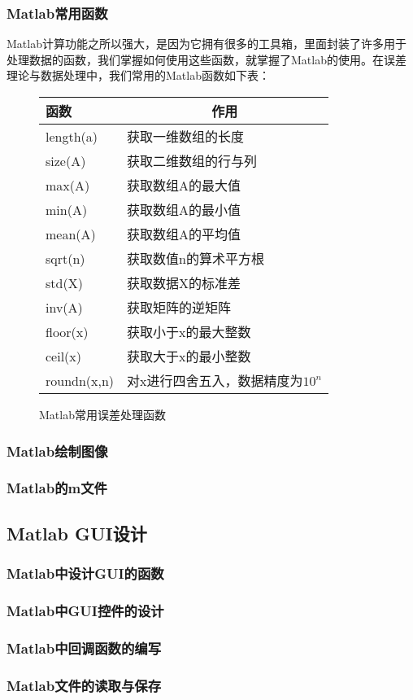 \subsubsection{Matlab常用函数}
Matlab计算功能之所以强大，是因为它拥有很多的工具箱，里面封装了许多用于处理数据的函数，我们掌握如何使用这些函数，就掌握了Matlab的使用。在误差理论与数据处理中，我们常用的Matlab函数如下表：
\begin{figure}[H]
	\centering
	\begin{tabular}{p{3cm}<{\centering}p{8cm}}
		\toprule
		\textbf{函数}&\multicolumn{1}{c}{\textbf{作用}}	\\
		\midrule
		length(a)	&获取一维数组的长度\\
		size(A)	&获取二维数组的行与列\\
		max(A)	&获取数组A的最大值\\
		min(A)	&获取数组A的最小值\\
		mean(A)	&获取数组A的平均值\\
		sqrt(n)	&获取数值n的算术平方根\\
		std(X)	&获取数据X的标准差\\
		inv(A)	&获取矩阵的逆矩阵\\
		floor(x)	&获取小于x的最大整数\\
		ceil(x)	&获取大于x的最小整数\\
		roundn(x,n)	&对x进行四舍五入，数据精度为$ 10^n $\\
		\bottomrule
	\end{tabular}
	\captionsetup{type=table}
	\caption{Matlab常用误差处理函数}
\end{figure}
\subsubsection{Matlab绘制图像}
\subsubsection{Matlab的m文件}

\subsection{Matlab GUI设计}
\subsubsection{Matlab中设计GUI的函数}
\subsubsection{Matlab中GUI控件的设计}
\subsubsection{Matlab中回调函数的编写}
\subsubsection{Matlab文件的读取与保存}